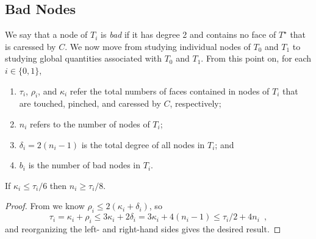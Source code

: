 \documentclass{patmorin}
\newcommand{\dual}[1]{{#1}^\star}
\newcommand{\note}[2]{{\color{red}[#1:~#2]}}
\begin{document}
\subsection{Bad Nodes}


We say that a node of $T_i$ is \emph{bad} if it has degree 2 and
contains no face of $\dual{T}$ that is caressed by $C$.  We now move
from studying individual nodes of $T_0$ and $T_1$ to studying global
quantities associated with $T_0$ and $T_1$.  From this point on, for
each $i\in\{0,1\}$,
\begin{enumerate}
  \item $\tau_i$, $\rho_i$, and $\kappa_i$ refer the total numbers of faces contained in nodes of $T_i$ that are touched, pinched, and caressed by $C$, respectively; 
  \item $n_i$ refers to the number of nodes of $T_i$;
  \item $\delta_i = 2(n_i-1)$ is the total degree of all nodes in $T_i$; and
  \item $b_i$ is the number of bad nodes in $T_i$.
\end{enumerate}


\begin{lem}
  If $\kappa_i \le \tau_i/6$ then $n_i\ge \tau_i/8$.
\end{lem}

\begin{proof}
	From  we know $\rho_i \le 2(\kappa_i+\delta_i)$, so
  \[
  \tau_i  = \kappa_i + \rho_i
     \le 3\kappa_i + 2\delta_i 
     = 3\kappa_i + 4(n_i-1) 
     \le \tau_i/2 + 4n_i \enspace ,
  \]
  and reorganizing the left- and right-hand sides gives the desired result.
\end{proof}
\end{document}
